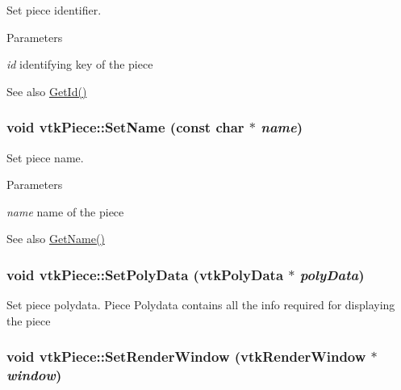 Set piece identifier. 
\begin{DoxyParams}{Parameters}
\item[{\em id}]identifying key of the piece \end{DoxyParams}
\begin{DoxySeeAlso}{See also}
\hyperlink{classvtkPiece_a2c1faf03ee84364ed939a330d58ab2a6}{GetId()} 
\end{DoxySeeAlso}
\hypertarget{classvtkPiece_ad7a95670a66a62e24e7685a6b8f6dafe}{
\subsubsection[{SetName}]{\setlength{\rightskip}{0pt plus 5cm}void vtkPiece::SetName (const char $\ast$ {\em name})}}
\label{classvtkPiece_ad7a95670a66a62e24e7685a6b8f6dafe}


Set piece name. 
\begin{DoxyParams}{Parameters}
\item[{\em name}]name of the piece \end{DoxyParams}
\begin{DoxySeeAlso}{See also}
\hyperlink{classvtkPiece_aaaf5a6463ed77fff3a6ece4612db0e13}{GetName()} 
\end{DoxySeeAlso}
\hypertarget{classvtkPiece_a0efb6741a7e3251558b940a92bed9267}{
\subsubsection[{SetPolyData}]{\setlength{\rightskip}{0pt plus 5cm}void vtkPiece::SetPolyData (vtkPolyData $\ast$ {\em polyData})}}
\label{classvtkPiece_a0efb6741a7e3251558b940a92bed9267}


Set piece polydata. Piece Polydata contains all the info required for displaying the piece \hypertarget{classvtkPiece_ad34b59d8e6996866b71bb4abb6c46fdb}{
\subsubsection[{SetRenderWindow}]{\setlength{\rightskip}{0pt plus 5cm}void vtkPiece::SetRenderWindow (vtkRenderWindow $\ast$ {\em window})}}
\label{classvtkPiece_ad34b59d8e6996866b71bb4abb6c46fdb}



